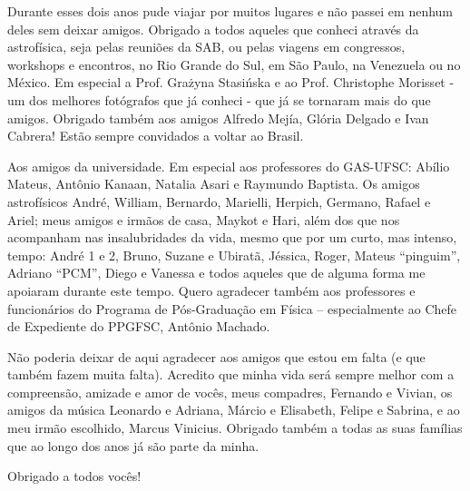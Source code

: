 Durante esses dois anos pude viajar por muitos lugares e não passei em nenhum deles sem deixar amigos. Obrigado a todos
aqueles que conheci através da astrofísica, seja pelas reuniões da SAB, ou pelas viagens em congressos, workshops
e encontros, no Rio Grande do Sul, em São Paulo, na Venezuela ou no México. Em especial a Prof. Gra\.zyna Stasi\'nska e ao
Prof. Christophe Morisset - um dos melhores fotógrafos que já conheci - que já se tornaram mais do que amigos. Obrigado
também aos amigos Alfredo Mejía, Glória Delgado e Ivan Cabrera! Estão sempre convidados a voltar ao Brasil.

Aos amigos da universidade. Em especial aos professores do GAS-UFSC: Abílio Mateus, Antônio Kanaan, Natalia Asari e
Raymundo Baptista. Os amigos astrofísicos André, William, Bernardo, Marielli, Herpich, Germano, Rafael e Ariel; meus
amigos e irmãos de casa, Maykot e Hari, além dos que nos acompanham nas insalubridades da vida, mesmo que por um
curto, mas intenso, tempo: André 1 e 2, Bruno, Suzane e Ubiratã, Jéssica, Roger, Mateus ``pinguim'', Adriano ``PCM'',
Diego e Vanessa e todos aqueles que de alguma forma me apoiaram durante este tempo. Quero agradecer também aos
professores e funcionários do Programa de Pós-Graduação em Física – especialmente ao Chefe de Expediente do PPGFSC,
Antônio Machado.

Não poderia deixar de aqui agradecer aos amigos que estou em falta (e que também fazem muita falta). Acredito que minha
vida será sempre melhor com a compreensão, amizade e amor de vocês, meus compadres, Fernando e Vivian, os amigos da
música Leonardo e Adriana, Márcio e Elisabeth, Felipe e Sabrina, e ao meu irmão escolhido, Marcus Vinicius. Obrigado
também a todas as suas famílias que ao longo dos anos já são parte da minha.

Obrigado a todos vocês!

